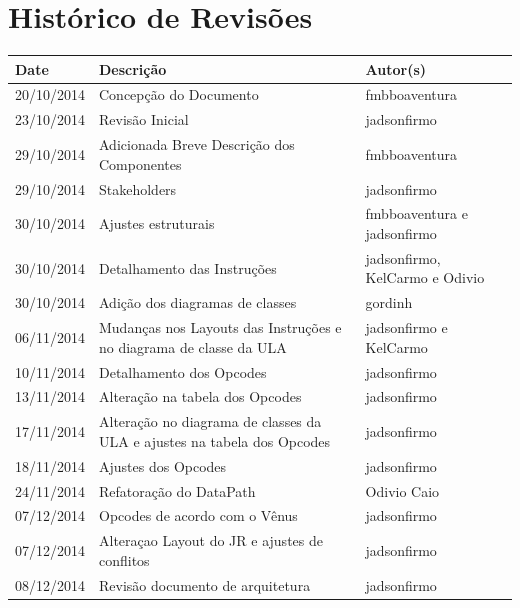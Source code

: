 \documentclass{report}
\begin{document}

\capa
\newpage
\newpage

\chapter*{Histórico de Revisões}
  \vspace*{1cm}
  \begin{table}[ht]
    \centering
    \begin{tabular}[pos]{|m{2cm} | m{8cm} | m{4cm}|} 
      \hline
      \cellcolor[gray]{0.9}
      \textbf{Date} & \cellcolor[gray]{0.9}\textbf{Descrição} & \cellcolor[gray]{0.9}\textbf{Autor(s)}\\
      \hline 20/10/2014 &  Concepção do Documento & fmbboaventura \\ \hline
      		 23/10/2014 &  Revisão Inicial & jadsonfirmo \\ \hline
      		 29/10/2014 &  Adicionada Breve Descrição dos Componentes & fmbboaventura \\ \hline       
      		 29/10/2014 & Stakeholders & jadsonfirmo \\ \hline
      		 30/10/2014 & Ajustes estruturais & fmbboaventura e jadsonfirmo \\ \hline
      		 30/10/2014 & Detalhamento das Instruções & jadsonfirmo, KelCarmo e Odivio \\ \hline
      		 30/10/2014 & Adição dos diagramas de classes & gordinh \\ \hline
      		 06/11/2014 & Mudanças nos Layouts das Instruções e no diagrama de classe da ULA & jadsonfirmo e KelCarmo \\ \hline
      		 10/11/2014 & Detalhamento dos Opcodes & jadsonfirmo \\ \hline
      		 13/11/2014 & Alteração na tabela dos Opcodes & jadsonfirmo \\ \hline
      		 17/11/2014 & Alteração no diagrama de classes da ULA e ajustes na tabela dos Opcodes & jadsonfirmo \\ \hline
      		 18/11/2014 & Ajustes dos Opcodes & jadsonfirmo \\ \hline
 		     24/11/2014 & Refatoração do DataPath & Odivio Caio \\ \hline
		  	 07/12/2014 & Opcodes de acordo com o Vênus & jadsonfirmo \\ \hline
		  	 07/12/2014 & Alteraçao Layout do JR e ajustes de conflitos & jadsonfirmo \\ \hline
		  	 08/12/2014 & Revisão documento de arquitetura & jadsonfirmo \\ \hline
    \end{tabular}
  \end{table}
\end{document}
